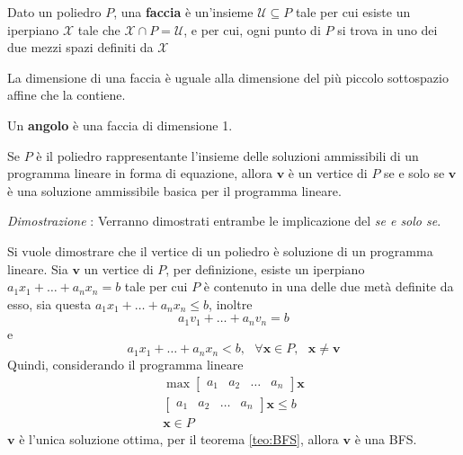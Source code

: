\documentclass[10pt, letterpaper]{report}
\begin{document}
\begin{definizione}
    Dato un poliedro $P$, una \textbf{faccia} è un'insieme $\mathcal U\subseteq P$ tale per cui esiste un iperpiano $\mathcal X$ tale che $\mathcal X\cap P = \mathcal U$, e per cui, ogni punto di $P$ si trova in uno dei due mezzi spazi definiti da $\mathcal X$
\end{definizione}
La dimensione di una faccia è uguale alla dimensione del più piccolo sottospazio affine che la contiene.
\begin{definizione}
    Un \textbf{angolo} è una faccia di dimensione 1.
\end{definizione}
\begin{teorema}
    Se $P$ è il poliedro rappresentante l'insieme delle soluzioni ammissibili di un programma lineare in forma di equazione, allora $\mathbf v$ è un vertice di $P$ se e solo se $\mathbf v$ è una soluzione ammissibile basica per il programma lineare.
\end{teorema}
\textit{Dimostrazione} : Verranno dimostrati entrambe le implicazione del \textit{se e solo se}.

\boxedMath{$\implies$} Si vuole dimostrare che il vertice di un poliedro è soluzione di un programma lineare. Sia $\mathbf v$ un vertice di $P$, per definizione, esiste un iperpiano $a_1x_1+\dots+a_nx_n=b$ tale per cui $P$ è contenuto in una delle due metà definite da esso, sia questa $a_1x_1+\dots+a_nx_n\le b$, inoltre 
$$a_1v_1+\dots +a_nv_n=b  
$$
e 
$$ a_1x_1+\dots +a_nx_n<b, \ \ \ \forall \mathbf x\in P, \ \ \ \mathbf x\ne\mathbf v  $$
Quindi, considerando il programma lineare 
\begin{eqnarray}
     \max \begin{bmatrix}
        a_1&a_2&\dots&a_n
    \end{bmatrix}\mathbf x\\\begin{bmatrix}
        a_1&a_2&\dots&a_n
    \end{bmatrix}\mathbf x \le b \\ \mathbf x \in P
\end{eqnarray}
$\mathbf v$ è l'unica soluzione ottima, per il teorema \ref{teo:BFS}, allora $\mathbf v$ è una BFS.
\end{document}
